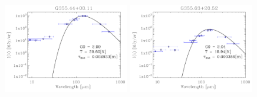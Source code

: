 \begin{figure}[!htb]
\includegraphics[trim=-1mm -1mm -1mm -1mm, clip, width=55mm]{appB/appB_96.pdf}
\includegraphics[trim=-1mm -1mm -1mm -1mm, clip, width=55mm]{appB/appB_97.pdf}
\end{figure}
 

